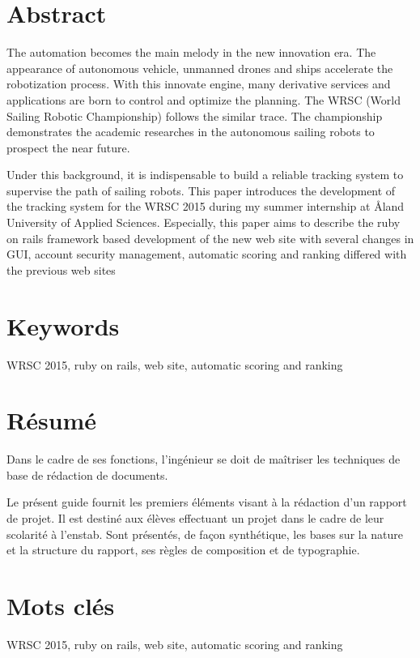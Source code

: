 
\section*{Abstract}
The automation becomes the main melody in the new innovation era. The appearance of autonomous vehicle, unmanned drones and ships accelerate the robotization process. With this innovate engine, many derivative services and applications are born to control and optimize the planning. The WRSC (World Sailing Robotic Championship) follows the similar trace. The championship demonstrates the academic researches in the autonomous sailing robots to prospect the near future. 

Under this background, it is indispensable to build a reliable tracking system to supervise the path of sailing robots. This paper introduces the development of the tracking system for the WRSC 2015 during my summer internship at Åland University of Applied Sciences. Especially, this paper aims to describe the ruby on rails framework based development of the new web site with several changes in GUI, account security management, automatic scoring and ranking differed with the previous web sites

  
\section*{Keywords}
WRSC 2015, ruby on rails, web site, automatic scoring and ranking



\section*{Résumé}
  Dans le cadre de ses fonctions, l'ingénieur se doit de maîtriser les
  techniques de base de rédaction de documents.

  Le présent guide fournit les premiers éléments visant à la rédaction d'un
  rapport de projet. Il est destiné aux élèves effectuant un projet dans le
  cadre de leur scolarité à l'\gls{enstab}.  Sont présentés, de façon
  synthétique, les bases sur la nature et la structure du rapport, ses règles
  de composition et de typographie.

\section*{Mots clés}
WRSC 2015, ruby on rails, web site, automatic scoring and ranking





